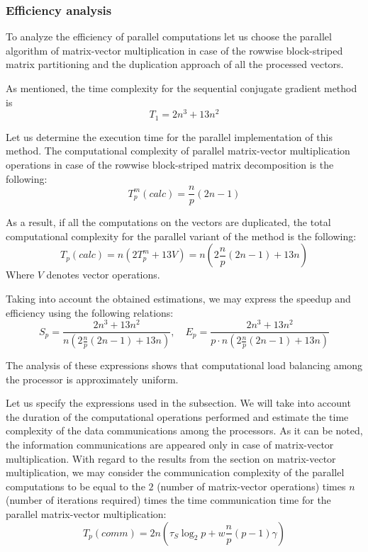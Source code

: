 \subsubsection{Efficiency analysis} %
\label{ssub:efficienct_analysis}
To analyze the efficiency of parallel computations let us choose the parallel algorithm of matrix-vector multiplication in case of the rowwise block-striped matrix partitioning and the duplication approach of all the processed vectors.

As mentioned, the time complexity for the sequential conjugate gradient method is
\[
  T_1 = 2n^3 + 13n^2
\]

Let us determine the execution time for the parallel implementation of this method. The computational
complexity of parallel matrix-vector multiplication operations in case of the rowwise block-striped matrix
decomposition is the following:
\begin{equation}
  T_p^m (calc) = \frac{n}{p} (2n-1)
\end{equation}

As a result, if all the computations on the vectors are duplicated, the total computational complexity for the parallel variant of the method is the following:
\begin{equation}
  T_p (calc) = n(2T_p^m + 13V) = n \left( 2\frac{n}{p} (2n-1) + 13n \right)
\end{equation}
Where $V$ denotes vector operations.

Taking into account the obtained estimations, we may express the speedup and efficiency using the following
relations:
\begin{equation}
  S_p = \frac{2n^{3}+13n^{2}}{n\left(2\frac{n}{p}(2n-1)+13n\right)},\quad E_{p}=\frac{2n^{3}+13n^{2}}{p\cdot n\left(2\frac{n}{p}(2n-1)+13n\right)}
\end{equation}

The analysis of these expressions shows that computational load balancing among the processor is approximately uniform.

Let us specify the expressions used in the subsection. We will take into account the duration of the computational operations performed and estimate the time complexity of the data communications among the processors. As it can be noted, the information communications are appeared only in case of matrix-vector multiplication. With regard to the results from the section on matrix-vector multiplication, we may consider the communication complexity of the parallel computations to be equal to the $2$ (number of matrix-vector operations) times $n$ (number of iterations required) times the time communication time for the parallel matrix-vector multiplication:
\begin{equation}
  T_p(comm)  = 2n (\tau_S \log_2 p + w \frac{n}{p} (p-1)\gamma)
\end{equation}

